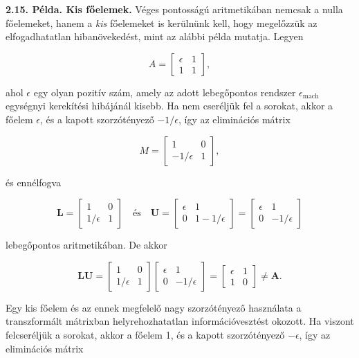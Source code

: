 \documentclass[
  magyar,
  11pt]{article}
\providecommand{\boldsymbol}[1]{\mathbf{#1}}
\begin{document}
\textbf{2.15. Példa. Kis főelemek.} Véges pontosságú aritmetikában
nemcsak a nulla főelemeket, hanem a \emph{kis} főelemeket is kerülnünk
kell, hogy megelőzzük az elfogadhatatlan hibanövekedést, mint az alábbi
példa mutatja. Legyen

\[A = \begin{bmatrix} \epsilon & 1 \\ 1 & 1 \end{bmatrix},\]

ahol \(\epsilon\) egy olyan pozitív szám, amely az adott lebegőpontos
rendszer \(\epsilon_{\text{mach}}\) egységnyi kerekítési hibájánál
kisebb. Ha nem cseréljük fel a sorokat, akkor a főelem \(\epsilon\), és
a kapott szorzótényező \(-1/\epsilon\), így az eliminációs mátrix

\[M = \begin{bmatrix} 1 & 0 \\ -1/\epsilon & 1 \end{bmatrix},\]

és ennélfogva

\[\boldsymbol{L} = \begin{bmatrix} 1 & 0 \\ 1/\epsilon & 1 \end{bmatrix} \quad \text{és} \quad \boldsymbol{U} = \begin{bmatrix} \epsilon & 1 \\ 0 & 1 - 1/\epsilon \end{bmatrix} = \begin{bmatrix} \epsilon & 1 \\ 0 & -1/\epsilon \end{bmatrix}\]

lebegőpontos aritmetikában. De akkor

\[\boldsymbol{L}\boldsymbol{U} = \begin{bmatrix} 1 & 0 \\ 1/\epsilon & 1 \end{bmatrix} \begin{bmatrix} \epsilon & 1 \\ 0 & -1/\epsilon \end{bmatrix} = \begin{bmatrix} \epsilon & 1 \\ 1 & 0 \end{bmatrix} \neq \boldsymbol{A}.\]

Egy kis főelem és az ennek megfelelő nagy szorzótényező használata a
transzformált mátrixban helyrehozhatatlan információvesztést okozott. Ha
viszont felcseréljük a sorokat, akkor a főelem 1, és a kapott
szorzótényező \(-\epsilon\), így az eliminációs mátrix
\end{document}
